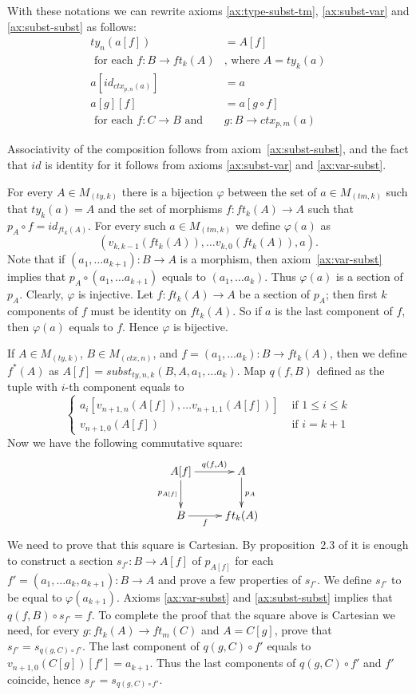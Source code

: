 \documentclass[reqno]{amsart}
\theoremstyle{definition}
\theoremstyle{remark}
\numberwithin{figure}{section}
\begin{document}
With these notations we can rewrite axioms \eqref{ax:type-subst-tm}, \eqref{ax:subst-var} and \eqref{ax:subst-subst} as follows:
\begin{align*}
ty_n(a[f]) & = A[f] \\
\text{ for each } f : B \to ft_k(A) & \text{, where } A = ty_k(a) \\
a[id_{ctx_{p,n}(a)}] & = a \\
a[g][f] & = a[g \circ f] \\
\text{ for each } f : C \to B \text{ and } & g : B \to ctx_{p,m}(a)
\end{align*}

Associativity of the composition follows from axiom~\eqref{ax:subst-subst}, and the fact that $id$ is identity for it follows from axioms \eqref{ax:subst-var} and \eqref{ax:var-subst}.

For every $A \in M_{(ty,k)}$ there is a bijection $\varphi$ between the set of $a \in M_{(tm,k)}$ such that $ty_k(a) = A$
    and the set of morphisms $f : ft_k(A) \to A$ such that $p_A \circ f = id_{ft_k(A)}$.
For every such $a \in M_{(tm,k)}$ we define $\varphi(a)$ as
\[ (v_{k,k-1}(ft_k(A)), \ldots v_{k,0}(ft_k(A)), a). \]
Note that if $(a_1, \ldots a_{k+1}) : B \to A$ is a morphism, then axiom~\eqref{ax:var-subst} implies that $p_A \circ (a_1, \ldots a_{k+1})$ equals to $(a_1, \ldots a_k)$.
Thus $\varphi(a)$ is a section of $p_A$.
Clearly, $\varphi$ is injective.
Let $f : ft_k(A) \to A$ be a section of $p_A$; then first $k$ components of $f$ must be identity on $ft_k(A)$.
So if $a$ is the last component of $f$, then $\varphi(a)$ equals to $f$.
Hence $\varphi$ is bijective.

If $A \in M_{(ty,k)}$, $B \in M_{(ctx,n)}$, and $f = (a_1, \ldots a_k) : B \to ft_k(A)$, then we define $f^*(A)$ as $A[f] = subst_{ty,n,k}(B, A, a_1, \ldots a_k)$.
Map $q(f,B)$ defined as the tuple with $i$-th component equals to
\[ \left\{
  \begin{array}{lr}
    a_i[v_{n+1,n}(A[f]), \ldots v_{n+1,1}(A[f])] & \text{ if } 1 \leq i \leq k \\
    v_{n+1,0}(A[f])                              & \text{ if } i = k+1
  \end{array}
\right. \]
Now we have the following commutative square:
\[ \xymatrix{ A[f] \ar[r]^-{q(f,A)} \ar[d]_{p_{A[f]}} & A \ar[d]^{p_A} \\
              B \ar[r]_-f                             & ft_k(A)
            } \]
We need to prove that this square is Cartesian.
By proposition~2.3 of \cite{c-systems} it is enough to construct a section $s_{f'} : B \to A[f]$ of $p_{A[f]}$
    for each $f' = (a_1, \ldots a_k, a_{k+1}) : B \to A$ and prove a few properties of $s_{f'}$.
We define $s_{f'}$ to be equal to $\varphi(a_{k+1})$.
Axioms \eqref{ax:var-subst} and \eqref{ax:subst-subst} implies that $q(f,B) \circ s_{f'} = f$.
To complete the proof that the square above is Cartesian we need, for every $g : ft_k(A) \to ft_m(C)$ and $A = C[g]$, prove that $s_{f'} = s_{q(g,C) \circ f'}$.
The last component of $q(g,C) \circ f'$ equals to $v_{n+1,0}(C[g])[f'] = a_{k+1}$.
Thus the last components of $q(g,C) \circ f'$ and $f'$ coincide, hence $s_{f'} = s_{q(g,C) \circ f'}$.
\end{document}
